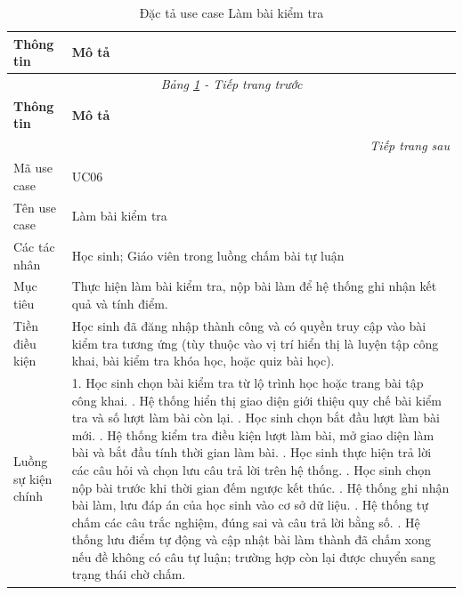 ﻿\documentclass[../DoAn.tex]{subfiles}
\begin{document}
\begin{longtable}{|p{3.5cm}|p{10.5cm}|}
\caption{Đặc tả use case Làm bài kiểm tra}
\label{table:uc06_lam_bai_kiem_tra} \\
\hline
\textbf{Thông tin} & \textbf{Mô tả} \\ \hline
\endfirsthead

\hline
\multicolumn{2}{|c|}{\textit{Bảng \ref{table:uc06_lam_bai_kiem_tra} - Tiếp trang trước}} \\ \hline
\textbf{Thông tin} & \textbf{Mô tả} \\ \hline
\endhead

\hline
\multicolumn{2}{|r|}{\textit{Tiếp trang sau}} \\ \hline
\endfoot

\hline
\endlastfoot

Mã use case & UC06 \\ \hline
Tên use case & Làm bài kiểm tra \\ \hline
Các tác nhân & Học sinh; Giáo viên trong luồng chấm bài tự luận \\ \hline
Mục tiêu & Thực hiện làm bài kiểm tra, nộp bài làm để hệ thống ghi nhận kết quả và tính điểm. \\ \hline
Tiền điều kiện & Học sinh đã đăng nhập thành công và có quyền truy cập vào bài kiểm tra tương ứng (tùy thuộc vào vị trí hiển thị là luyện tập công khai, bài kiểm tra khóa học, hoặc quiz bài học). \\ \hline
Luồng sự kiện chính & 
1. Học sinh chọn bài kiểm tra từ lộ trình học hoặc trang bài tập công khai. \newline
2. Hệ thống hiển thị giao diện giới thiệu quy chế bài kiểm tra và số lượt làm bài còn lại. \newline
3. Học sinh chọn bắt đầu lượt làm bài mới. \newline
4. Hệ thống kiểm tra điều kiện lượt làm bài, mở giao diện làm bài và bắt đầu tính thời gian làm bài. \newline
5. Học sinh thực hiện trả lời các câu hỏi và chọn lưu câu trả lời trên hệ thống. \newline
6. Học sinh chọn nộp bài trước khi thời gian đếm ngược kết thúc. \newline
7. Hệ thống ghi nhận bài làm, lưu đáp án của học sinh vào cơ sở dữ liệu. \newline
8. Hệ thống tự chấm các câu trắc nghiệm, đúng sai và câu trả lời bằng số. \newline
9. Hệ thống lưu điểm tự động và cập nhật bài làm thành đã chấm xong nếu đề không có câu tự luận; trường hợp còn lại được chuyển sang trạng thái chờ chấm. \newline

\end{longtable}
\end{document}
